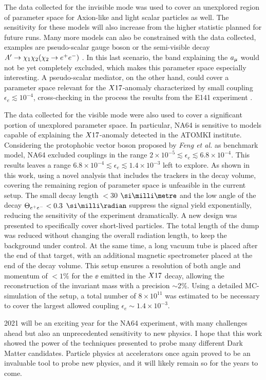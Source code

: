 The data collected for the invisible mode was used to cover an unexplored region of parameter space for Axion-like and light scalar particles as well. The sensitivity for these models will also increase from the higher statistic planned for future runs. Many more models can also be constrained with the data collected, examples are pseudo-scalar gauge boson or the semi-visible decay $A' \to \chi_1 \chi_2 (\chi_2 \to e^+e^-)$ \cite{Mohlabeng_2019}. In this last scenario, the band explaining the $a_{\mu}$ would not be yet completely excluded, which makes this parameter space especially interesting. A pseudo-scalar mediator, on the other hand, could cover a parameter space relevant for the $X17$-anomaly characterized by small coupling $\epsilon_e \lesssim 10^{-4}$, cross-checking in the process the results from the E141 experiment \cite{blum}.

The data collected for the visible mode were also used to cover a significant portion of unexplored parameter space. In particular, NA64 is sensitive to models capable of explaining the $X17$-anomaly detected in the ATOMKI institute. Considering the protophobic vector boson proposed by \textit{Feng et al.}\cite{Feng:2016jff} as benchmark model, NA64 excluded couplings in the range $2 \times 10^{-5} \lesssim \epsilon_e \lesssim 6.8 \times 10^{-4}$. This results leaves a range $6.8 \times 10^{-4} \lesssim \epsilon_e \lesssim 1.4 \times 10^{-3}$ left to explore. As shown in this work, using a novel analysis that includes the trackers in the decay volume, covering the remaining region of parameter space is unfeasible in the current setup. The small decay length $<$30 $\mmi$ and the low angle of the decay $\Theta_{ e^+e^-} < 0.3$ $\mrad$ suppress the signal yield exponentially, reducing the sensitivity of the experiment dramatically. A new design was presented to specifically cover short-lived particles. The total length of the dump was reduced without changing the overall radiation length, to keep the background under control. At the same time, a long vacuum tube is placed after the end of that target, with an additional magnetic spectrometer placed at the end of the decay volume. This setup ensures a resolution of both angle and momentum of $<1\%$ for the $\ee$ emitted in the $X17$ decay, allowing the reconstruction of the invariant mass with a precision $\sim$2\%. Using a detailed MC-simulation of the setup, a total number of $8 \times 10^{11}$ was estimated to be necessary to cover the largest allowed coupling $\epsilon_e \sim 1.4 \times 10^{-3}$.

2021 will be an exciting year for the NA64 experiment, with many challenges ahead but also an unprecedented sensitivity to new physics. I hope that this work showed the power of the techniques presented to probe many different Dark Matter candidates. Particle physics at accelerators once again proved to be an invaluable tool to probe new physics, and it will likely remain so for the years to come.


